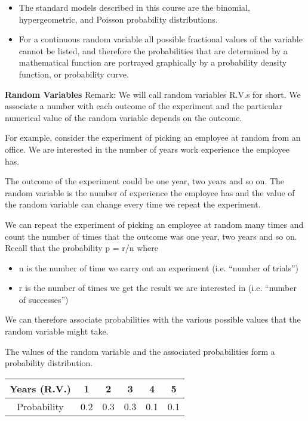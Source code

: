\documentclass[]{report}
\begin{document}
{\begin{itemize}
\item  The standard models described in this course are
the binomial, hypergeometric, and Poisson probability distributions.

\item For a continuous random variable all possible fractional values of the variable cannot be listed, and
therefore the probabilities that are determined by a mathematical function are portrayed graphically by a
probability density function, or probability curve.
\end{itemize}









\noindent \textbf{Random Variables}
Remark: We will call random variables R.V.s for short.
We associate a number with each outcome of the experiment and the particular numerical value of the random variable depends on the outcome.

For example, consider the experiment of picking an employee at random from an office. We are interested in the number of years work experience the employee has.


The outcome of the experiment could be one year, two years and so on. The random variable is the number of experience the employee has and the value of the random variable can change every time we repeat the experiment.


We can repeat the experiment of picking an employee at random many times and count the number of times that the outcome was one year, two years and so on.
Recall that the probability p = r/n where

\begin{itemize}
\item n is the number of time we carry out an experiment (i.e.    “number of trials”) 
\item r is the number of times we get the result we are interested in (i.e. “number of successes”)


\end{itemize}



We can therefore associate probabilities with the various possible values that the random variable might take.

The values of the random variable and the associated probabilities form a probability distribution.

\begin{center}
\begin{tabular}{|c|c|c|c|c|c|} \hline
Years (R.V.)   & 1& 2& 3& 4& 5\\ \hline 
Probability& 0.2& 0.3& 0.3& 0.1& 0.1\\ \hline 
\end{tabular} 
\end{center}


}
\end{document}
